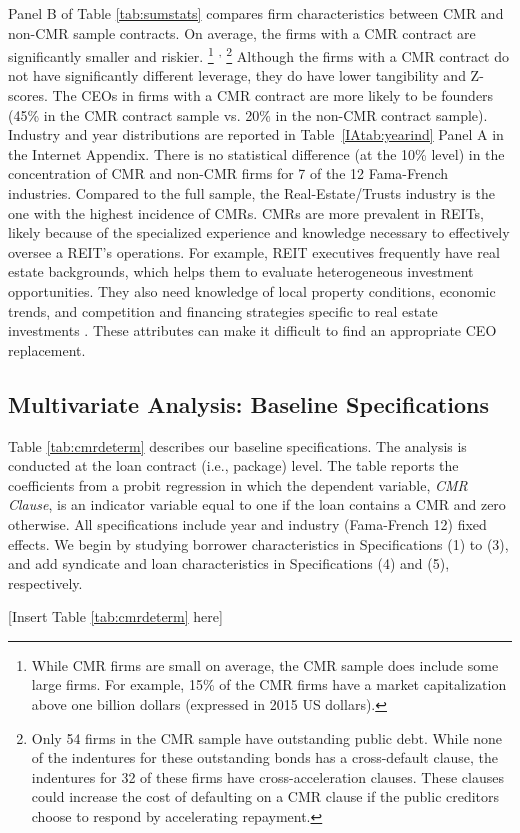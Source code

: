 \documentclass[a4paper,12pt]{article}
\begin{document}
Panel B of Table \ref{tab:sumstats} compares firm characteristics between CMR and non-CMR sample contracts.
On average, the firms with a CMR contract are significantly smaller and riskier.%
  \footnote{While CMR firms are small on average, the CMR sample does include some large firms. For example, 15\% of the CMR firms have a market capitalization above one billion dollars (expressed in 2015 US dollars).}%
  \textsuperscript{,}%
  \footnote{Only 54 firms in the CMR sample have outstanding public debt. While none of the indentures for these outstanding bonds has a cross-default clause, the indentures for 32 of these firms have cross-acceleration clauses. These clauses could increase the cost of defaulting on a CMR clause if the public creditors choose to respond by accelerating repayment.}
Although the firms with a CMR contract do not have significantly different leverage, they do have lower tangibility and Z-scores.
The CEOs in firms with a CMR contract are more likely to be founders (45\% in the CMR contract sample vs. 20\% in the non-CMR contract sample).
Industry and year distributions are reported in Table~\ref{IAtab:yearind} Panel A in the Internet Appendix. 
There is no statistical difference (at the 10\% level) in the concentration of CMR and non-CMR firms for 7 of the 12 Fama-French industries.
Compared to the full sample, the Real-Estate/Trusts industry is the one with the highest incidence of CMRs.
CMRs are more prevalent in REITs, likely because of the specialized experience and knowledge necessary to effectively oversee a REIT's operations.
For example, REIT executives frequently have real estate backgrounds, which helps them to evaluate heterogeneous investment opportunities.
They also need knowledge of local property conditions, economic trends, and competition and financing strategies specific to real estate investments \citep{Han_2006}.
These attributes can make it difficult to find an appropriate CEO replacement.



\subsection{Multivariate Analysis: Baseline Specifications}
\label{section:inclusion_baseprobit}

Table \ref{tab:cmrdeterm} describes our baseline specifications. The analysis is conducted at the loan contract (i.e., package) level.
The table reports the coefficients from a probit regression in which the dependent variable, \textit{CMR Clause}, is an indicator variable equal to one if the loan contains a CMR and zero otherwise.
All specifications include year and industry (Fama-French 12) fixed effects.
We begin by studying borrower characteristics in Specifications (1) to (3), and add syndicate and loan characteristics in Specifications (4) and (5), respectively.
\begin{center}
	[Insert Table \ref{tab:cmrdeterm} here]
\end{center}
\end{document}
